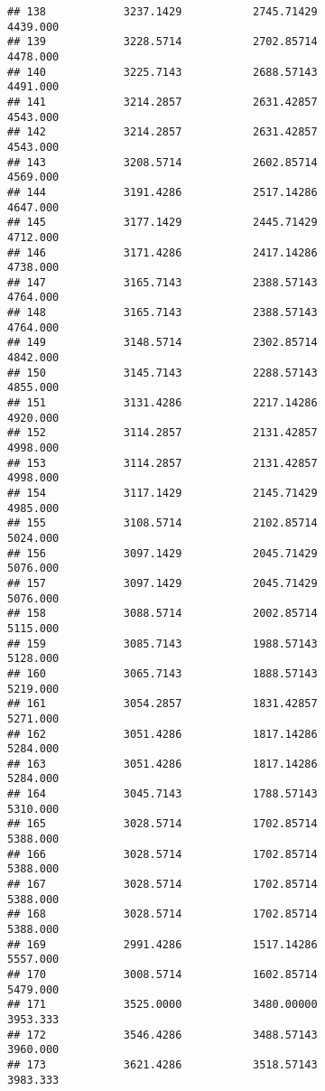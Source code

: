 \documentclass[]{article}
\begin{document}
\begin{verbatim}
## 138            3237.1429           2745.71429                4439.000
## 139            3228.5714           2702.85714                4478.000
## 140            3225.7143           2688.57143                4491.000
## 141            3214.2857           2631.42857                4543.000
## 142            3214.2857           2631.42857                4543.000
## 143            3208.5714           2602.85714                4569.000
## 144            3191.4286           2517.14286                4647.000
## 145            3177.1429           2445.71429                4712.000
## 146            3171.4286           2417.14286                4738.000
## 147            3165.7143           2388.57143                4764.000
## 148            3165.7143           2388.57143                4764.000
## 149            3148.5714           2302.85714                4842.000
## 150            3145.7143           2288.57143                4855.000
## 151            3131.4286           2217.14286                4920.000
## 152            3114.2857           2131.42857                4998.000
## 153            3114.2857           2131.42857                4998.000
## 154            3117.1429           2145.71429                4985.000
## 155            3108.5714           2102.85714                5024.000
## 156            3097.1429           2045.71429                5076.000
## 157            3097.1429           2045.71429                5076.000
## 158            3088.5714           2002.85714                5115.000
## 159            3085.7143           1988.57143                5128.000
## 160            3065.7143           1888.57143                5219.000
## 161            3054.2857           1831.42857                5271.000
## 162            3051.4286           1817.14286                5284.000
## 163            3051.4286           1817.14286                5284.000
## 164            3045.7143           1788.57143                5310.000
## 165            3028.5714           1702.85714                5388.000
## 166            3028.5714           1702.85714                5388.000
## 167            3028.5714           1702.85714                5388.000
## 168            3028.5714           1702.85714                5388.000
## 169            2991.4286           1517.14286                5557.000
## 170            3008.5714           1602.85714                5479.000
## 171            3525.0000           3480.00000                3953.333
## 172            3546.4286           3488.57143                3960.000
## 173            3621.4286           3518.57143                3983.333

\end{verbatim}
\end{document}
